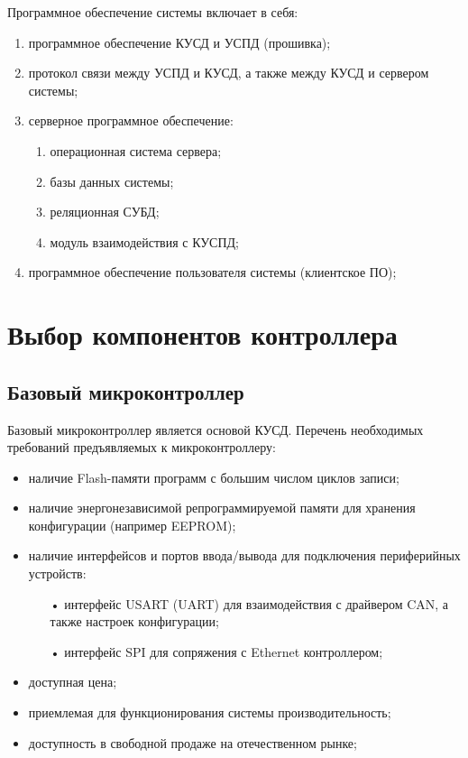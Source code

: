 Программное обеспечение системы включает в себя:

\begin{enumerate}
	\item программное обеспечение КУСД и УСПД (прошивка);
	\item протокол связи между УСПД и КУСД, а также между КУСД и сервером системы;
	\item серверное программное обеспечение:
	\begin{enumerate}
		\item операционная система сервера;
		\item базы данных системы;
		\item реляционная СУБД;
		\item модуль взаимодействия с КУСПД;
	\end{enumerate}
	\item программное обеспечение пользователя системы (клиентское ПО);
\end{enumerate}

\section{Выбор компонентов контроллера}

\subsection{Базовый микроконтроллер}

Базовый микроконтроллер является основой КУСД. Перечень необходимых требований предъявляемых к микроконтроллеру:
\begin{itemize}
	\item наличие Flash-памяти программ с большим числом циклов записи;
	\item наличие энергонезависимой репрограммируемой памяти для хранения конфигурации (например EEPROM);
	\item наличие интерфейсов и портов ввода/вывода для подключения периферийных устройств:
	\begin{itemize}
		\item[•] интерфейс USART (UART) для взаимодействия с драйвером CAN, а также настроек конфигурации;
		\item[•] интерфейс SPI для сопряжения с Ethernet контроллером;
	\end{itemize}
	\item доступная цена;
	\item приемлемая для функционирования системы производительность;
	\item доступность в свободной продаже на отечественном рынке;
\end{itemize}

